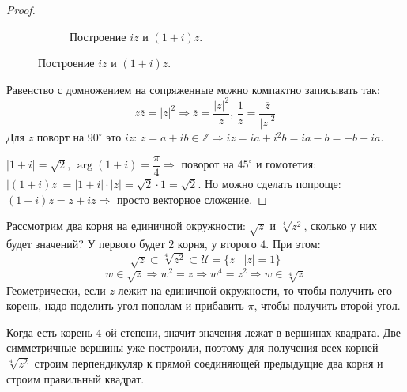 \documentclass[12pt]{article}
\newcommand{\MZ}{\mathbb{Z}}
\newcommand{\MU}{\mathcal{U}}
\theoremstyle{definition}
\newcommand{\ovl}[1]{\overline{#1}}
\begin{document}
\begin{proof}
\begin{figure}[H]
\begin{subfigure}{.5\textwidth}
			\caption{Построение $iz$ и $(1 + i)z$.}
			\label{AL1S3_3}
		\end{subfigure}
	\end{figure}
	Равенство с домножением на сопряженные можно компактно записывать так:
	$$
		z\ovl{z} = |z|^2 \Rightarrow \ovl{z} = \dfrac{|z|^2}{z}, \, \dfrac{1}{z} = \dfrac{\ovl{z}}{|z|^2}
	$$
	Для $z$ поворт на $90^\circ$ это $iz$: $z = a + ib \in \MZ \Rightarrow iz = ia + i^2b = ia - b=  -b + ia$.
	
	$|1+ i| = \sqrt{2}, \, \arg( 1 + i) = \dfrac{\pi}{4} \Rightarrow$ поворот на $45^\circ$ и гомотетия: $|(1 + i)z| = |1 + i|{\cdot}|z| =\sqrt{2}{\cdot}1 = \sqrt{2}$. Но можно сделать попроще: $(1 + i)z = z + iz \Rightarrow$ просто векторное сложение.
\end{proof}

Рассмотрим два корня на единичной окружности: $\sqrt{z}$ и $\sqrt[4]{z^2}$, сколько у них будет значений? У первого будет $2$ корня, у второго $4$. При этом: 
$$
	\sqrt{z}\subset \sqrt[4]{z^2} \subset \MU = \{ z \mid |z| = 1\}
$$
$$
	w \in \sqrt{z} \Rightarrow w^2 = z \Rightarrow  w^4 = z^2 \Rightarrow w \in \sqrt[4]{z}
$$ 
Геометрически, если $z$ лежит на единичной окружности, то чтобы получить его корень, надо поделить угол пополам и прибавить $\pi$, чтобы получить второй угол. 

Когда есть корень $4$-ой степени, значит значения лежат в вершинах квадрата. Две симметричные вершины уже построили, поэтому для получения всех корней $\sqrt[4]{z^2}$ строим перпендикуляр к прямой соединяющей предыдущие два корня и строим правильный квадрат.
\end{document}
